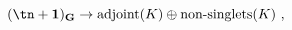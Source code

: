 \begin{equation}
\mathbf{(\tn+1)_{G}}\rightarrow \textrm{adjoint}(K)\oplus
\textrm{non-singlets}(K) \ ,
\end{equation}

